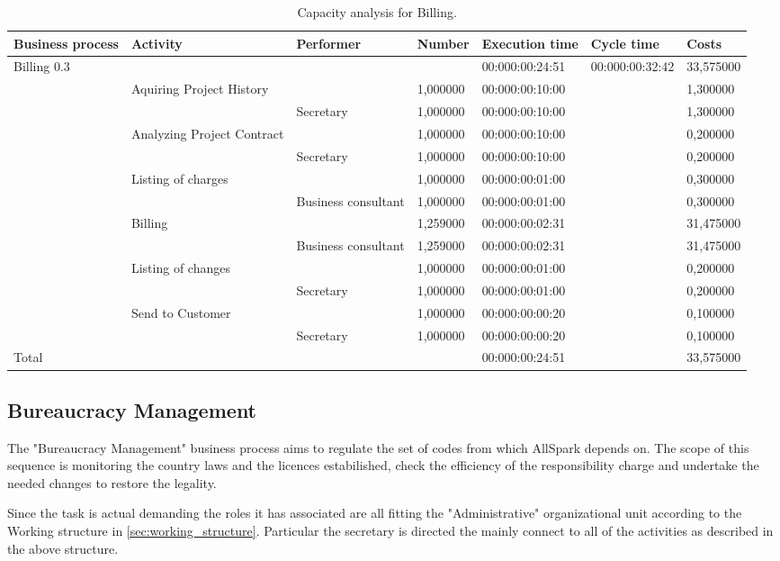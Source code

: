 \begin{table}
\centering
{\tiny
\begin{tabular}{|l|l|l|l|l|l|l|}
Business process&Activity&Performer&Number&Execution time&Cycle time&Costs\\
\hline
Billing 0.3&&&&00:000:00:24:51&00:000:00:32:42&33,575000\\
\hline
&Aquiring Project History &&1,000000&00:000:00:10:00&&1,300000\\
\hline
&&Secretary&1,000000&00:000:00:10:00&&1,300000\\
\hline
&Analyzing Project Contract &&1,000000&00:000:00:10:00&&0,200000\\
\hline
&&Secretary&1,000000&00:000:00:10:00&&0,200000\\
\hline
&Listing of charges &&1,000000&00:000:00:01:00&&0,300000\\
\hline
&&Business consultant&1,000000&00:000:00:01:00&&0,300000\\
\hline
&Billing &&1,259000&00:000:00:02:31&&31,475000\\
\hline
&&Business consultant&1,259000&00:000:00:02:31&&31,475000\\
\hline
&Listing of changes &&1,000000&00:000:00:01:00&&0,200000\\
\hline
&&Secretary&1,000000&00:000:00:01:00&&0,200000\\
\hline
&Send to Customer &&1,000000&00:000:00:00:20&&0,100000\\
\hline
&&Secretary&1,000000&00:000:00:00:20&&0,100000\\
\hline
Total&&&&00:000:00:24:51&&33,575000
\end{tabular}
}
\caption{Capacity analysis for Billing.}
\end{table}
%

%

\subsection{Bureaucracy Management}
The "Bureaucracy Management" business process aims to regulate the set of codes from which AllSpark depends on. The scope of this sequence is monitoring the country laws and the licences estabilished, check the efficiency of the responsibility charge and undertake the needed changes to restore the legality.

Since the task is actual demanding the roles it has associated are all fitting the "Administrative" organizational unit according to the Working structure in \ref{sec:working_structure}. Particular the secretary is directed the mainly connect to all of the activities as described in the above structure.

